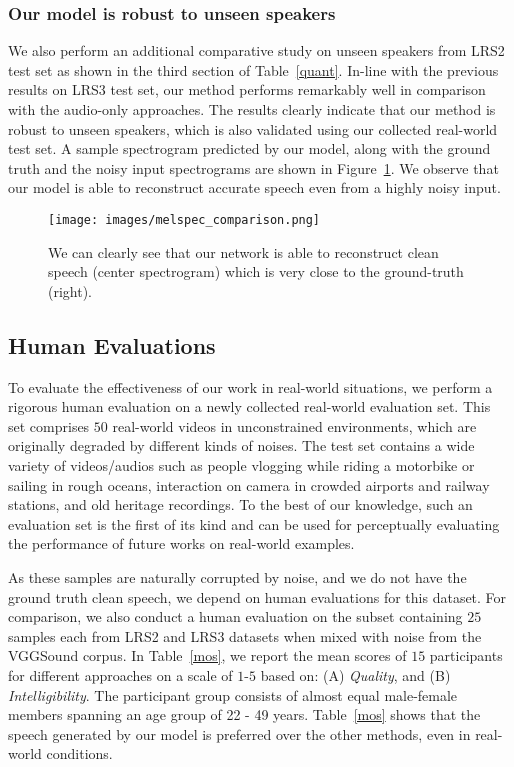 \documentclass[10pt,twocolumn,letterpaper]{article}
\begin{document}
\subsubsection{Our model is robust to unseen speakers}
We also perform an additional comparative study on unseen speakers from LRS2 test set as shown in the third section of Table~\ref{quant}. In-line with the previous results on LRS3 test set, our method performs remarkably well in comparison with the audio-only approaches. The results clearly indicate that our method is robust to unseen speakers, which is also validated using our collected real-world test set. A sample spectrogram predicted by our model, along with the ground truth and the noisy input spectrograms are shown in Figure~\ref{fig:speech_res}. We observe that our model is able to reconstruct accurate speech even from a highly noisy input.


\begin{figure}[ht]
  \texttt{[image: images/melspec\_comparison.png]}
  \caption{We can clearly see that our network is able to reconstruct clean speech (center spectrogram) which is very close to the ground-truth (right).}
  \label{fig:speech_res}
  \vspace{-10pt}
\end{figure}
 

\subsection{Human Evaluations}
To evaluate the effectiveness of our work in real-world situations, we perform a rigorous human evaluation on a newly collected real-world evaluation set. This set comprises $50$ real-world videos in unconstrained environments, which are originally degraded by different kinds of noises. The test set contains a wide variety of videos/audios such as people vlogging while riding a motorbike or sailing in rough oceans, interaction on camera in crowded airports and railway stations, and old heritage recordings. To the best of our knowledge, such an evaluation set is the first of its kind and can be used for perceptually evaluating the performance of future works on real-world examples. 

As these samples are naturally corrupted by noise, and we do not have the ground truth clean speech, we depend on human evaluations for this dataset. For comparison, we also conduct a human evaluation on the subset containing $25$ samples each from LRS2 and LRS3 datasets when mixed with noise from the VGGSound corpus. In Table~\ref{mos}, we report the mean scores of $15$ participants for different approaches on a scale of $1$-$5$ based on: (A) \textit{Quality}, and (B) \textit{Intelligibility}. The participant group consists of almost equal male-female members spanning an age group of 22 - 49 years. Table~\ref{mos} shows that the speech generated by our model is preferred over the other methods, even in real-world conditions.
\end{document}
